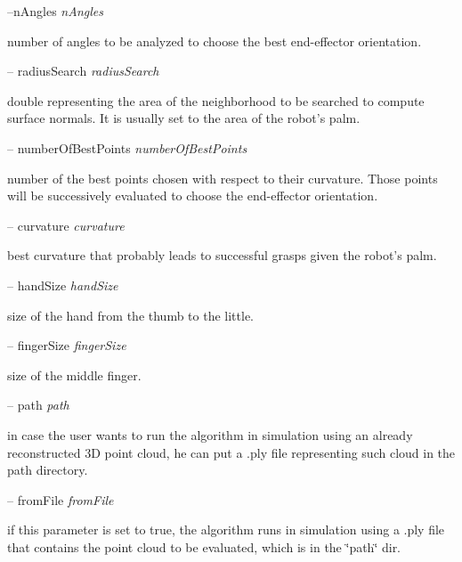 --n\+Angles {\itshape n\+Angles} 
\begin{DoxyItemize}
\item number of angles to be analyzed to choose the best end-\/effector orientation.
\end{DoxyItemize}

-- radius\+Search {\itshape radius\+Search} 
\begin{DoxyItemize}
\item double representing the area of the neighborhood to be searched to compute surface normals. It is usually set to the area of the robot's palm.
\end{DoxyItemize}

-- number\+Of\+Best\+Points {\itshape number\+Of\+Best\+Points} 
\begin{DoxyItemize}
\item number of the best points chosen with respect to their curvature. Those points will be successively evaluated to choose the end-\/effector orientation.
\end{DoxyItemize}

-- curvature {\itshape curvature} 
\begin{DoxyItemize}
\item best curvature that probably leads to successful grasps given the robot's palm.
\end{DoxyItemize}

-- hand\+Size {\itshape hand\+Size} 
\begin{DoxyItemize}
\item size of the hand from the thumb to the little.
\end{DoxyItemize}

-- finger\+Size {\itshape finger\+Size} 
\begin{DoxyItemize}
\item size of the middle finger.
\end{DoxyItemize}

-- path {\itshape path} 
\begin{DoxyItemize}
\item in case the user wants to run the algorithm in simulation using an already reconstructed 3\+D point cloud, he can put a .ply file representing such cloud in the path directory.
\end{DoxyItemize}

-- from\+File {\itshape from\+File} 
\begin{DoxyItemize}
\item if this parameter is set to true, the algorithm runs in simulation using a .ply file that contains the point cloud to be evaluated, which is in the \char`\"{}path\char`\"{} dir.
\end{DoxyItemize}

